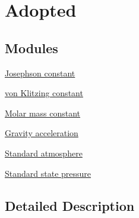 \hypertarget{group___adopted}{}\section{Adopted}
\label{group___adopted}
\subsection*{Modules}
\begin{DoxyCompactItemize}
\item 
\hyperlink{group___conventional_josephson_constant}{Josephson constant}
\item 
\hyperlink{group___conventionalvon_klitzing_constant}{von Klitzing constant}
\item 
\hyperlink{group___molar_mass_constant}{Molar mass constant}
\item 
\hyperlink{group___gravity_acceleration}{Gravity acceleration}
\item 
\hyperlink{group___standard_atmosphere}{Standard atmosphere}
\item 
\hyperlink{group___standard_state_pressure}{Standard state pressure}
\end{DoxyCompactItemize}


\subsection{Detailed Description}
